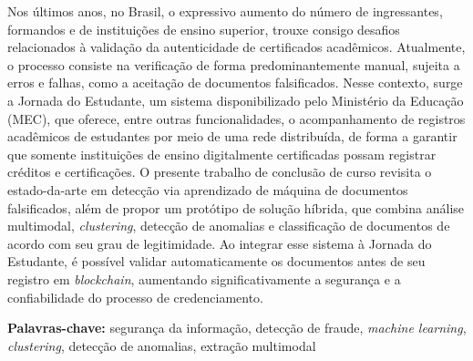 \begin{resumo}
    Nos últimos anos, no Brasil, o expressivo aumento do número de ingressantes, formandos e de instituições de ensino superior, trouxe consigo desafios relacionados à validação da autenticidade de certificados acadêmicos. Atualmente, o processo consiste na verificação de forma predominantemente manual, sujeita a erros e falhas, como a aceitação de documentos falsificados.
    Nesse contexto, surge a Jornada do Estudante, um sistema disponibilizado pelo Ministério da Educação (MEC), que oferece, entre outras funcionalidades, o acompanhamento de registros acadêmicos de estudantes por meio de uma rede distribuída, de forma a garantir que somente instituições de ensino digitalmente certificadas possam registrar créditos e certificações.
    O presente trabalho de conclusão de curso revisita o estado-da-arte em detecção via aprendizado de máquina de documentos falsificados, além de propor um protótipo de solução híbrida, que combina análise multimodal, \textit{clustering}, detecção de anomalias e classificação de documentos de acordo com seu grau de legitimidade.
    Ao integrar esse sistema à Jornada do Estudante, é possível validar automaticamente os documentos antes de seu registro em \textit{blockchain}, aumentando significativamente a segurança e a confiabilidade do processo de credenciamento.

  

    \textbf{Palavras-chave:} segurança da informação, detecção de fraude, \textit{machine learning}, \textit{clustering}, detecção de anomalias, extração multimodal
\end{resumo}

